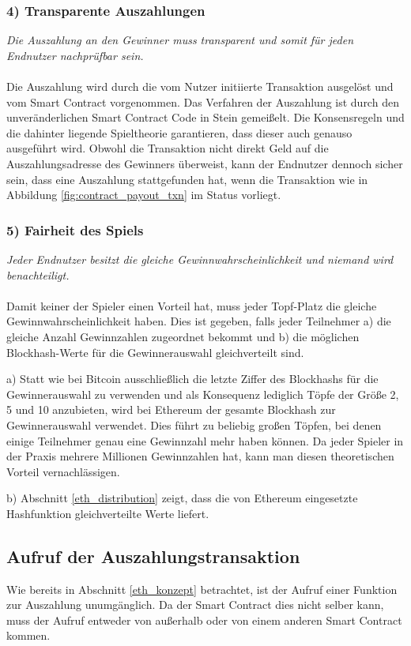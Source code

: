 \subsubsection{4) Transparente Auszahlungen}
\textit{Die Auszahlung an den Gewinner muss transparent und somit für jeden Endnutzer nachprüfbar sein.}\\\\
Die Auszahlung wird durch die vom Nutzer initiierte  Transaktion ausgelöst und vom Smart Contract vorgenommen. Das Verfahren der Auszahlung ist durch den unveränderlichen Smart Contract Code in Stein gemeißelt. Die Konsensregeln und die dahinter liegende Spieltheorie garantieren, dass dieser auch genauso ausgeführt wird. Obwohl die  Transaktion nicht direkt Geld auf die Auszahlungsadresse des Gewinners überweist, kann der Endnutzer dennoch sicher sein, dass eine Auszahlung stattgefunden hat, wenn die  Transaktion wie in Abbildung \ref{fig:contract_payout_txn} im Status  vorliegt.
\subsubsection{5) Fairheit des Spiels}
\textit{Jeder Endnutzer besitzt die gleiche Gewinnwahrscheinlichkeit und niemand wird benachteiligt.}\\\\
Damit keiner der Spieler einen Vorteil hat, muss jeder Topf-Platz die gleiche Gewinnwahrscheinlichkeit haben.
Dies ist gegeben, falls jeder Teilnehmer a) die gleiche Anzahl Gewinnzahlen zugeordnet bekommt und b) die möglichen Blockhash-Werte für die Gewinnerauswahl gleichverteilt sind.

a) Statt wie bei Bitcoin ausschließlich die letzte Ziffer des Blockhashs für die Gewinnerauswahl zu verwenden und als Konsequenz lediglich Töpfe der Größe 2, 5 und 10 anzubieten, wird bei Ethereum der gesamte Blockhash zur Gewinnerauswahl verwendet. Dies führt zu beliebig großen Töpfen, bei denen einige Teilnehmer genau eine Gewinnzahl mehr haben können. Da jeder Spieler in der Praxis mehrere Millionen Gewinnzahlen hat, kann man diesen theoretischen Vorteil vernachlässigen.

b) Abschnitt \ref{eth_distribution} zeigt, dass die von Ethereum eingesetzte  Hashfunktion gleichverteilte Werte liefert.


\subsection{Aufruf der Auszahlungstransaktion}
Wie bereits in Abschnitt \ref{eth_konzept} betrachtet, ist der Aufruf einer Funktion zur Auszahlung unumgänglich. Da der Smart Contract dies nicht selber kann, muss der Aufruf entweder von außerhalb oder von einem anderen Smart Contract kommen.

